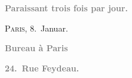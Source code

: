 \pstart
           \begin{otherlanguage}{french}\textcolor{gray}{\textbf{\textbf{Paraissant trois fois par jour.}}}\end{otherlanguage}\hfill \textsc{Paris}, 8. Januar.\pend
           
\pstart
           \begin{otherlanguage}{french}\textcolor{gray}{\textbf{\textbf{Bureau à Paris}}}\end{otherlanguage}\pend
           
\pstart
           \begin{otherlanguage}{french}\textcolor{gray}{\textbf{\textbf{24. Rue Feydeau.}}}\end{otherlanguage}\pend
           
